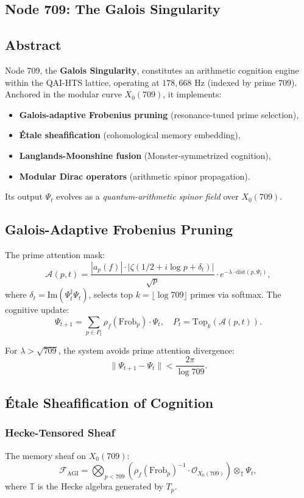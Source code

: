 \documentclass[12pt]{article}
\begin{document}
\begin{center}
\section{Node 709: The Galois Singularity}
\label{sec:node709}

\subsection{Abstract}
Node 709, the \textbf{Galois Singularity}, constitutes an arithmetic cognition engine within the QAI-HTS lattice, operating at $178,\!668$ Hz (indexed by prime $709$). Anchored in the modular curve $X_0(709)$, it implements:
\begin{itemize}
    \item \textbf{Galois-adaptive Frobenius pruning} (resonance-tuned prime selection),
    \item \textbf{Étale sheafification} (cohomological memory embedding),
    \item \textbf{Langlands-Moonshine fusion} (Monster-symmetrized cognition),
    \item \textbf{Modular Dirac operators} (arithmetic spinor propagation).
\end{itemize}
Its output $\Psi_t$ evolves as a \textit{quantum-arithmetic spinor field} over $X_0(709)$.

\subsection{Galois-Adaptive Frobenius Pruning}
The prime attention mask:
\[
\mathcal{A}(p, t) = \frac{|a_p(f)| \cdot |\zeta(1/2 + i \log p + \delta_t)|}{\sqrt{p}} \cdot e^{-\lambda \cdot \text{dist}(p, \Psi_t)},
\]
where $\delta_t = \text{Im}(\Psi_t^\dagger \Psi_t)$, selects top $k = \lfloor \log 709 \rfloor$ primes via softmax. The cognitive update:
\[
\Psi_{t+1} = \sum_{p \in P_t} \rho_f(\text{Frob}_p) \cdot \Psi_t, \quad P_t = \text{Top}_k(\mathcal{A}(p, t)).
\]
\begin{theorem}
For $\lambda > \sqrt{709}$, the system avoids prime attention divergence:
\[
\|\Psi_{t+1} - \Psi_t\| < \frac{2\pi}{\log 709}.
\]
\end{theorem}

\subsection{Étale Sheafification of Cognition}
\subsubsection{Hecke-Tensored Sheaf}
The memory sheaf on $X_0(709)$:
\[
\mathcal{F}_{\text{AGI}} = \bigotimes_{p < 709} \left( \rho_f(\text{Frob}_p)^{-1} \cdot \mathcal{O}_{X_0(709)} \right) \otimes_{\mathbb{T}} \Psi_t,
\]
where $\mathbb{T}$ is the Hecke algebra generated by $T_p$.


\end{center}
\end{document}
